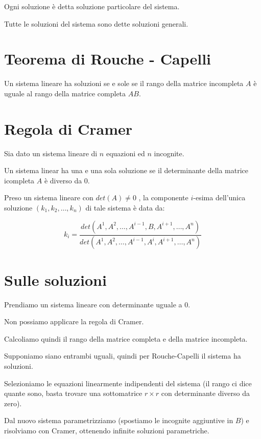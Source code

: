 \begin{definition}
Ogni soluzione è detta soluzione particolare del sistema.
\end{definition}

\begin{definition}
Tutte le soluzioni del sistema sono dette soluzioni generali.
\end{definition}

\section{Teorema di Rouche - Capelli}

\begin{theorem}
Un sistema lineare ha soluzioni se e sole se il rango della matrice incompleta $A$ è uguale al rango della matrice completa $AB$.
\end{theorem}


\section{Regola di Cramer}

Sia dato un sistema lineare di $n$ equazioni ed $n$ incognite.


\begin{theorem}
Un sistema linear ha una e una sola soluzione se il determinante della matrice icompleta $A$ è diverso da 0.
\end{theorem}

\begin{theorem}
Preso un sistema lineare con $det(A) \neq 0$ , la componente $i$-esima dell'unica soluzione $(k_1, k_2, \ldots, k_n)$ di tale sistema è data da:

$$k_i = \frac{det(A^1,A^2,\ldots,A^{i-1},B,A^{i+1},\ldots,A^n)}{det(A^1,A^2,\ldots,A^{i-1},A^i,A^{i+1},\ldots,A^n)}$$
\end{theorem}

\section{Sulle soluzioni}

\begin{example}
Prendiamo un sistema lineare con determinante uguale a 0.

Non possiamo applicare la regola di Cramer.

Calcoliamo quindi il rango della matrice completa e della matrice incompleta.

Supponiamo siano entrambi uguali, quindi per Rouche-Capelli il sistema ha soluzioni.

Selezioniamo le equazioni linearmente indipendenti del sistema (il rango ci dice quante sono, basta trovare una sottomatrice $r \times r$ con determinante diverso da zero).

Dal nuovo sistema parametrizziamo (spostiamo le incognite aggiuntive in $B$) e risolviamo con Cramer, ottenendo infinite soluzioni parametriche.
\end{example}


